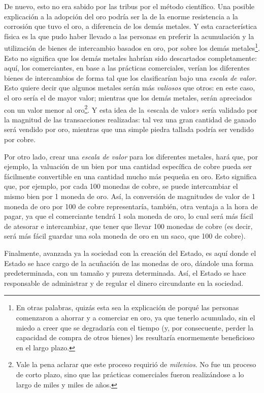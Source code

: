 \documentclass[12pt,a4paper,twoside]{book}
\begin{document}
De nuevo, esto no era sabido por las tribus por el método científico. Una posible explicación a la adopción del oro podría ser la de la enorme resistencia a la corrosión que tuvo el oro, a diferencia de los demás metales. Y esta característica física es la que pudo haber llevado a las personas en preferir la acumulación y la utilización de bienes de intercambio basados en oro, por sobre los demás metales\footnote{En otras palabras, quizás esta sea la explicación de porqué las personas comenzaron a ahorrar y a comerciar en oro, ya que tenerlo acumulado, sin el miedo a creer que se degradaría con el tiempo (y, por consecuente, perder la capacidad de compra de otros bienes) les resultaría enormemente beneficioso en el largo plazo.}. Esto no significa que los demás metales habrían sido descartados completamente: aquí, los comerciantes, en base a las prácticas comerciales, verían los diferentes bienes de intercambios de forma tal que los clasificarían bajo una \textit{escala de valor}. Esto quiere decir que algunos metales serán más \textit{valiosos} que otros: en este caso, el oro sería el de mayor valor; mientras que los demás metales, serán apreciados con un valor menor al oro\footnote{Vale la pena aclarar que este proceso requirió de \textit{milenios}. No fue un proceso de corto plazo, sino que las prácticas comerciales fueron realizándose a lo largo de miles y miles de años.}. Y esta idea de la «escala de valor» sería validado por la magnitud de las transacciones realizadas: tal vez una gran cantidad de ganado será vendido por oro, mientras que una simple piedra tallada podría ser vendido por cobre.

Por otro lado, crear una \textit{escala de valor} para los diferentes metales, hará que, por ejemplo, la valuación de un bien por una cantidad específica de cobre pueda ser fácilmente convertible en una cantidad mucho más pequeña en oro. Esto significa que, por ejemplo, por cada 100 monedas de cobre, se puede intercambiar el mismo bien por 1 moneda de oro. Así, la conversión de magnitudes de valor de 1 moneda de oro por 100 de cobre representaría, también, otra ventaja a la hora de pagar, ya que el comerciante tendrá 1 sola moneda de oro, lo cual será más fácil de atesorar e intercambiar, que tener que llevar 100 monedas de cobre (es decir, será más fácil guardar una sola moneda de oro en un saco, que 100 de cobre).

Finalmente, avanzada ya la sociedad con la creación del Estado, es aquí donde el Estado se hace cargo de la acuñación de las monedas de oro, dándole una forma predeterminada, con un tamaño y pureza determinada. Así, el Estado se hace responsable de administrar y de regular el dinero circundante en la sociedad.
\end{document}
